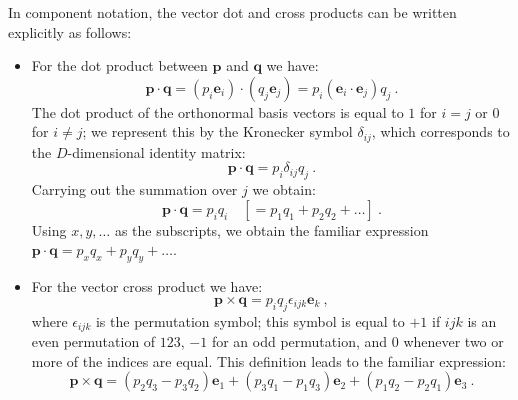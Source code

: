 \noindent In component notation, the vector dot and cross products can be written explicitly as follows:
\begin{itemize}
	\item For the dot product between $\mathbf{p}$ and $\mathbf{q}$ we have:
	\[
		\mathbf{p}\cdot\mathbf{q} = (p_i\mathbf{e}_i)\cdot(q_j\mathbf{e}_j)
		= p_i (\mathbf{e}_i\cdot\mathbf{e}_j) q_j \ .
	\]
	The dot product of the orthonormal basis vectors is equal to $1$ for $i=j$ or $0$ for $i\ne j$; we represent this by the Kronecker symbol $\delta_{ij}$, which corresponds to the $D$-dimensional identity matrix:
	\[
		\mathbf{p}\cdot\mathbf{q} = p_i \delta_{ij} q_j \ .
	\]
	Carrying out the summation over $j$ we obtain:
	\[
		\mathbf{p}\cdot\mathbf{q} = p_i q_i \quad [=p_1q_1+p_2q_2+\ldots ]\ .
	\]
	Using $x,y,\ldots$ as the subscripts, we obtain the familiar expression $\mathbf{p}\cdot\mathbf{q} =p_xq_x+p_yq_y+\ldots$.
	\item For the vector cross product we have:
	\[
		\mathbf{p}\times\mathbf{q} = p_iq_j \epsilon_{ijk} \mathbf{e}_k \ ,
	\]
	where $\epsilon_{ijk}$ is the permutation symbol; this symbol is equal to $+1$ if $ijk$ is an even permutation of $123$, $-1$ for an odd permutation, and $0$ whenever two or more of the indices are equal.  This definition leads to the familiar expression:
	\[
		\mathbf{p}\times\mathbf{q} = (p_2q_3-p_3q_2)\mathbf{e}_1 +(p_3q_1-p_1q_3)\mathbf{e}_2 +(p_1q_2-p_2q_1)\mathbf{e}_3 \ .
	\] 
\end{itemize}

